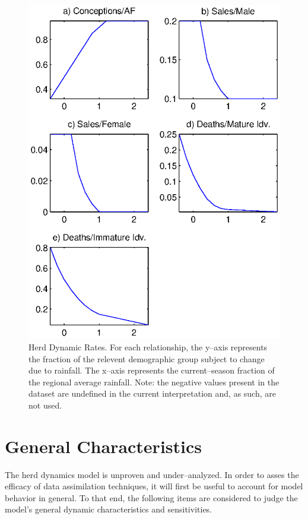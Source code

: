 \documentclass[fleqn, letterpaper]{amsart}
\begin{document}
\begin{figure}
\includegraphics[width=1.0\textwidth]{refrel}
\caption{Herd Dynamic Rates. For each relationship, the y--axis represents the fraction of the relevent demographic group subject to change due to rainfall. The x--axis represents the current--season fraction of the regional average rainfall. Note: the negative values present in the dataset are undefined in the current interpretation and, as such, are not used.}
\label{rferels}
\end{figure}

\section{General Characteristics}
The herd dynamics model is unproven and under--analyzed. In order to asses the efficacy of data assimilation techniques, it will first be useful to account for model behavior in general. 
To that end, the following items are considered to judge the model's general dynamic characteristics and sensitivities. 
\end{document}
